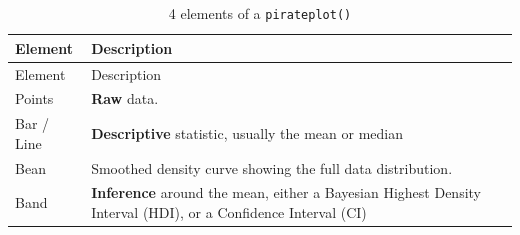 \documentclass[]{book}
\theoremstyle{definition}
\theoremstyle{definition}
\theoremstyle{remark}
\begin{document}
\begin{longtable}[]{@{}ll@{}}
\caption{\label{tab:pirateplotelements} 4 elements of a
\texttt{pirateplot()}}\tabularnewline
\toprule
\begin{minipage}[b]{0.18\columnwidth}\raggedright\strut
Element\strut
\end{minipage} & \begin{minipage}[b]{0.67\columnwidth}\raggedright\strut
Description\strut
\end{minipage}\tabularnewline
\midrule
\endfirsthead
\toprule
\begin{minipage}[b]{0.18\columnwidth}\raggedright\strut
Element\strut
\end{minipage} & \begin{minipage}[b]{0.67\columnwidth}\raggedright\strut
Description\strut
\end{minipage}\tabularnewline
\midrule
\endhead
\begin{minipage}[t]{0.18\columnwidth}\raggedright\strut
Points\strut
\end{minipage} & \begin{minipage}[t]{0.67\columnwidth}\raggedright\strut
\textbf{Raw} data.\strut
\end{minipage}\tabularnewline
\begin{minipage}[t]{0.18\columnwidth}\raggedright\strut
Bar / Line\strut
\end{minipage} & \begin{minipage}[t]{0.67\columnwidth}\raggedright\strut
\textbf{Descriptive} statistic, usually the mean or median\strut
\end{minipage}\tabularnewline
\begin{minipage}[t]{0.18\columnwidth}\raggedright\strut
Bean\strut
\end{minipage} & \begin{minipage}[t]{0.67\columnwidth}\raggedright\strut
Smoothed density curve showing the full data distribution.\strut
\end{minipage}\tabularnewline
\begin{minipage}[t]{0.18\columnwidth}\raggedright\strut
Band\strut
\end{minipage} & \begin{minipage}[t]{0.67\columnwidth}\raggedright\strut
\textbf{Inference} around the mean, either a Bayesian Highest Density
Interval (HDI), or a Confidence Interval (CI)\strut
\end{minipage}\tabularnewline
\bottomrule
\end{longtable}
\end{document}
